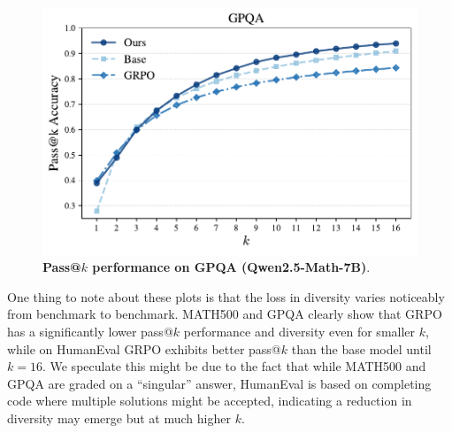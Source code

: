 \documentclass{article}
\begin{document}
\begin{figure}[h!]
    \centering
    \includegraphics[width=0.9\linewidth]{gpqa_passatk_alt_comparison.pdf}
    \captionsetup{font=small}
    \caption{\textbf{Pass@$k$ performance on GPQA (Qwen2.5-Math-7B)}. }
    \label{fig:apxpass2}
\end{figure}

One thing to note about these plots is that the loss in diversity varies noticeably from benchmark to benchmark. MATH500 and GPQA clearly show that GRPO has a significantly lower pass@$k$ performance and diversity even for smaller $k$, while on HumanEval GRPO exhibits better pass@$k$ than the base model until $k = 16$. We speculate this might be due to the fact that while MATH500 and GPQA are graded on a ``singular'' answer, HumanEval is based on completing code where multiple solutions might be accepted, indicating a reduction in diversity may emerge but at much higher $k$. 
\end{document}
